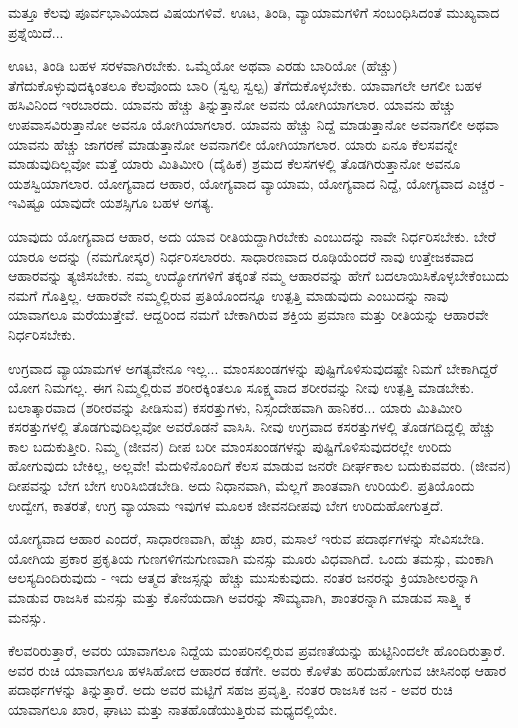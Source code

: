 ಮತ್ತೂ ಕೆಲವು ಪೂರ್ವಭಾವಿಯಾದ ವಿಷಯಗಳಿವೆ. ಊಟ, ತಿಂಡಿ, ವ್ಯಾಯಾಮಗಳಿಗೆ ಸಂಬಂಧಿಸಿದಂತೆ ಮುಖ್ಯವಾದ ಪ್ರಶ್ನೆಯಿದೆ...

ಊಟ, ತಿಂಡಿ ಬಹಳ ಸರಳವಾಗಿರಬೇಕು. ಒಮ್ಮೆಯೋ ಅಥವಾ ಎರಡು ಬಾರಿಯೋ (ಹೆಚ್ಚು) ತೆಗೆದುಕೊಳ್ಳುವುದಕ್ಕಿಂತಲೂ ಕೆಲವೊಂದು ಬಾರಿ (ಸ್ವಲ್ಪ ಸ್ವಲ್ಪ) ತೆಗೆದುಕೊಳ್ಳಬೇಕು. ಯಾವಾಗಲೇ ಆಗಲೀ ಬಹಳ ಹಸಿವಿನಿಂದ ಇರಬಾರದು. ಯಾವನು ಹೆಚ್ಚು ತಿನ್ನುತ್ತಾನೋ ಅವನು ಯೋಗಿಯಾಗಲಾರ. ಯಾವನು ಹೆಚ್ಚು ಉಪವಾಸವಿರುತ್ತಾನೋ ಅವನೂ ಯೋಗಿಯಾಗಲಾರ. ಯಾವನು ಹೆಚ್ಚು ನಿದ್ದೆ ಮಾಡುತ್ತಾನೋ ಅವನಾಗಲೀ ಅಥವಾ ಯಾವನು ಹೆಚ್ಚು ಜಾಗರಣೆ ಮಾಡುತ್ತಾನೋ ಅವನಾಗಲೀ ಯೋಗಿಯಾಗಲಾರ. ಯಾರು ಏನೂ ಕೆಲಸವನ್ನೇ ಮಾಡುವುದಿಲ್ಲವೋ ಮತ್ತೆ ಯಾರು ಮಿತಿಮೀರಿ (ದೈಹಿಕ) ಶ್ರಮದ ಕೆಲಸಗಳಲ್ಲಿ ತೊಡಗಿರುತ್ತಾನೋ ಅವನೂ ಯಶಸ್ವಿಯಾಗಲಾರ. ಯೋಗ್ಯವಾದ ಆಹಾರ, ಯೋಗ್ಯವಾದ ವ್ಯಾಯಾಮ, ಯೋಗ್ಯವಾದ ನಿದ್ದೆ, ಯೋಗ್ಯವಾದ ಎಚ್ಚರ - ಇವಿಷ್ಟೂ ಯಾವುದೇ ಯಶಸ್ಸಿಗೂ ಬಹಳ ಅಗತ್ಯ.

ಯಾವುದು ಯೋಗ್ಯವಾದ ಆಹಾರ, ಅದು ಯಾವ ರೀತಿಯದ್ದಾಗಿರಬೇಕು ಎಂಬುದನ್ನು ನಾವೇ ನಿರ್ಧರಿಸಬೇಕು. ಬೇರೆ ಯಾರೂ ಅದನ್ನು (ನಮಗೋಸ್ಕರ) ನಿರ್ಧರಿಸಲಾರರು. ಸಾಧಾರಣವಾದ ರೂಢಿಯೆಂದರೆ ನಾವು ಉತ್ತೇಜಕವಾದ ಆಹಾರವನ್ನು ತ್ಯಜಿಸಬೇಕು. ನಮ್ಮ ಉದ್ಯೋಗಗಳಿಗೆ ತಕ್ಕಂತೆ ನಮ್ಮ ಆಹಾರವನ್ನು ಹೇಗೆ ಬದಲಾಯಿಸಿಕೊಳ್ಳಬೇಕೆಂಬುದು ನಮಗೆ ಗೊತ್ತಿಲ್ಲ. ಆಹಾರವೇ ನಮ್ಮಲ್ಲಿರುವ ಪ್ರತಿಯೊಂದನ್ನೂ ಉತ್ಪತ್ತಿ ಮಾಡುವುದು ಎಂಬುದನ್ನು ನಾವು ಯಾವಾಗಲೂ ಮರೆಯುತ್ತೇವೆ. ಆದ್ದರಿಂದ ನಮಗೆ ಬೇಕಾಗಿರುವ ಶಕ್ತಿಯ ಪ್ರಮಾಣ ಮತ್ತು ರೀತಿಯನ್ನು ಆಹಾರವೇ ನಿರ್ಧರಿಸಬೇಕು.

ಉಗ್ರವಾದ ವ್ಯಾಯಾಮಗಳ ಅಗತ್ಯವೇನೂ ಇಲ್ಲ... ಮಾಂಸಖಂಡಗಳನ್ನು ಪುಷ್ಟಿಗೊಳಿಸುವುದಷ್ಟೇ ನಿಮಗೆ ಬೇಕಾಗಿದ್ದರೆ ಯೋಗ ನಿಮಗಲ್ಲ. ಈಗ ನಿಮ್ಮಲ್ಲಿರುವ ಶರೀರಕ್ಕಿಂತಲೂ ಸೂಕ್ಷ್ಮವಾದ ಶರೀರವನ್ನು ನೀವು ಉತ್ಪತ್ತಿ ಮಾಡಬೇಕು. ಬಲಾತ್ಕಾರವಾದ (ಶರೀರವನ್ನು ಪೀಡಿಸುವ) ಕಸರತ್ತುಗಳು, ನಿಸ್ಸಂದೇಹವಾಗಿ ಹಾನಿಕರ... ಯಾರು ಮಿತಿಮೀರಿ ಕಸರತ್ತುಗಳಲ್ಲಿ ತೊಡಗುವುದಿಲ್ಲವೋ ಅವರೊಡನೆ ವಾಸಿಸಿ. ನೀವು ಉಗ್ರವಾದ ಕಸರತ್ತುಗಳಲ್ಲಿ ತೊಡಗದಿದ್ದಲ್ಲಿ ಹೆಚ್ಚು ಕಾಲ ಬದುಕುತ್ತೀರಿ. ನಿಮ್ಮ (ಜೀವನ) ದೀಪ ಬರೀ ಮಾಂಸಖಂಡಗಳನ್ನು ಪುಷ್ಟಿಗೊಳಿಸುವುದರಲ್ಲೇ ಉರಿದು ಹೋಗುವುದು ಬೇಕಿಲ್ಲ, ಅಲ್ಲವೇ! ಮೆದುಳಿನೊಂದಿಗೆ ಕೆಲಸ ಮಾಡುವ ಜನರೇ ದೀರ್ಘಕಾಲ ಬದುಕುವವರು. (ಜೀವನ) ದೀಪವನ್ನು ಬೇಗ ಬೇಗ ಉರಿಸಿಬಿಡಬೇಡಿ. ಅದು ನಿಧಾನವಾಗಿ, ಮೆಲ್ಲಗೆ ಶಾಂತವಾಗಿ ಉರಿಯಲಿ. ಪ್ರತಿಯೊಂದು ಉದ್ವೇಗ, ಕಾತರತೆ, ಉಗ್ರ ವ್ಯಾಯಾಮ ಇವುಗಳ ಮೂಲಕ ಜೀವನದೀಪವು ಬೇಗ ಉರಿದುಹೋಗುತ್ತದೆ.

ಯೋಗ್ಯವಾದ ಆಹಾರ ಎಂದರೆ, ಸಾಧಾರಣವಾಗಿ, ಹೆಚ್ಚು ಖಾರ, ಮಸಾಲೆ ಇರುವ ಪದಾರ್ಥಗಳನ್ನು ಸೇವಿಸಬೇಡಿ. ಯೋಗಿಯ ಪ್ರಕಾರ ಪ್ರಕೃತಿಯ ಗುಣಗಳಿಗನುಗುಣವಾಗಿ ಮನಸ್ಸು ಮೂರು ವಿಧವಾಗಿದೆ. ಒಂದು ತಮಸ್ಸು, ಮಂಕಾಗಿ ಆಲಸ್ಯದಿಂದಿರುವುದು - ಇದು ಆತ್ಮದ ತೇಜಸ್ಸನ್ನು ಹೆಚ್ಚು ಮುಸುಕುವುದು. ನಂತರ ಜನರನ್ನು ಕ್ರಿಯಾಶೀಲರನ್ನಾಗಿ ಮಾಡುವ ರಾಜಸಿಕ ಮನಸ್ಸು ಮತ್ತು ಕೊನೆಯದಾಗಿ ಅವರನ್ನು ಸೌಮ್ಯವಾಗಿ, ಶಾಂತರನ್ನಾಗಿ ಮಾಡುವ ಸಾತ್ತ್ವಿ ಕ ಮನಸ್ಸು.

ಕೆಲವರಿರುತ್ತಾರೆ, ಅವರು ಯಾವಾಗಲೂ ನಿದ್ದೆಯ ಮಂಪರಿನಲ್ಲಿರುವ ಪ್ರವಣತೆಯನ್ನು ಹುಟ್ಟಿನಿಂದಲೇ ಹೊಂದಿರುತ್ತಾರೆ. ಅವರ ರುಚಿ ಯಾವಾಗಲೂ ಹಳಸಿಹೋದ ಆಹಾರದ ಕಡೆಗೇ. ಅವರು ಕೊಳೆತು ಹರಿದುಹೋಗುವ ಚೀಸಿನಂಥ ಆಹಾರ ಪದಾರ್ಥಗಳನ್ನು ತಿನ್ನುತ್ತಾರೆ. ಅದು ಅವರ ಮಟ್ಟಿಗೆ ಸಹಜ ಪ್ರವೃತ್ತಿ. ನಂತರ ರಾಜಸಿಕ ಜನ - ಅವರ ರುಚಿ ಯಾವಾಗಲೂ ಖಾರ, ಘಾಟು ಮತ್ತು ನಾತಹೊಡೆಯುತ್ತಿರುವ ಮಧ್ಯದಲ್ಲಿಯೇ.

